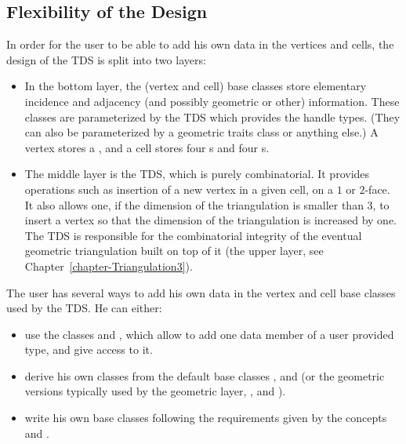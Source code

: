 \subsection{Flexibility of the Design}

In order for the user to be able to add his own data in the vertices and cells,
the design of the TDS is split into two layers:

\begin{itemize}
\item{} In the bottom layer, the (vertex and cell) base classes store
elementary incidence and adjacency (and possibly geometric or other)
information.  These classes are parameterized by the TDS which provides the
handle types.  (They can also be parameterized by a geometric traits class or
anything else.) A vertex stores a , and a cell stores four
s and four s.

\item{} The middle layer is the TDS, which is purely combinatorial.  It
provides operations such as insertion of a new vertex in a given cell, on a $1$
or $2$-face. It also allows one, if the dimension of the triangulation is
smaller than $3$, to insert a vertex so that the dimension of the triangulation
is increased by one. The TDS is responsible for the combinatorial integrity of
the eventual geometric triangulation built on top of it (the upper layer,
see Chapter~\ref{chapter-Triangulation3}).
\end{itemize}

The user has several ways to add his own data in the vertex and cell base classes used by the TDS.  He can either:
\begin{itemize}
\item{} use the classes 
and , which allow to add one data member
of a user provided type, and give access to it.
\item{} derive his own classes from the default base classes
, and  (or
the geometric versions typically used by the geometric layer,
, and ).
\item{} write his own base classes following the requirements given by the
concepts  and 
.
\end{itemize}

